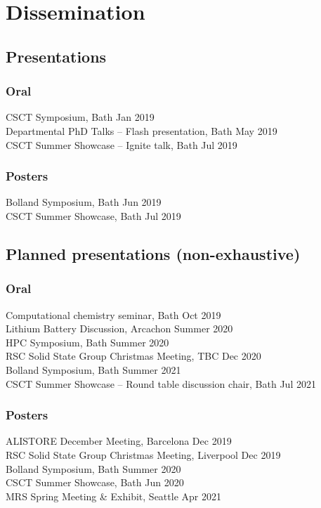\vspace{-6cm}
\thispagestyle{plain}
\section*{Dissemination}
\subsection*{Presentations}
\subsubsection*{Oral}
CSCT Symposium, Bath \dotfill Jan 2019\\
Departmental PhD Talks -- Flash presentation, Bath \dotfill May 2019\\
CSCT Summer Showcase -- Ignite talk, Bath \dotfill Jul 2019
\subsubsection*{Posters}
Bolland Symposium, Bath \dotfill Jun 2019\\
CSCT Summer Showcase, Bath \dotfill Jul 2019
\subsection*{Planned presentations (non-exhaustive)}
\subsubsection*{Oral}
Computational chemistry seminar, Bath \dotfill Oct 2019\\
Lithium Battery Discussion, Arcachon \dotfill Summer 2020\\
HPC Symposium, Bath \dotfill Summer 2020\\
RSC Solid State Group Christmas Meeting, TBC \dotfill Dec 2020\\
Bolland Symposium, Bath \dotfill Summer 2021\\
CSCT Summer Showcase -- Round table discussion chair, Bath \dotfill Jul 2021
\subsubsection*{Posters}
ALISTORE December Meeting, Barcelona \dotfill Dec 2019\\
RSC Solid State Group Christmas Meeting, Liverpool \dotfill Dec 2019\\
Bolland Symposium, Bath \dotfill Summer 2020\\
CSCT Summer Showcase, Bath \dotfill Jun 2020\\
MRS Spring Meeting \& Exhibit, Seattle \dotfill Apr 2021\\
